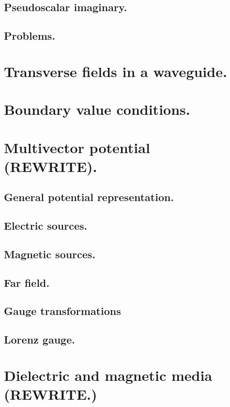          \subsection{Pseudoscalar imaginary.}
            
         \subsection{Problems.}
            
      \section{Transverse fields in a waveguide.}
         
      \section{Boundary value conditions.}
         
      \section{Multivector potential (REWRITE).}
         \subsection{General potential representation.}
            
         \subsection{Electric sources.}
            
         \subsection{Magnetic sources.}
            
         \subsection{Far field.}
            
         \subsection{Gauge transformations}
            
         \subsection{Lorenz gauge.}
            
      \section{Dielectric and magnetic media (REWRITE.)}
         
